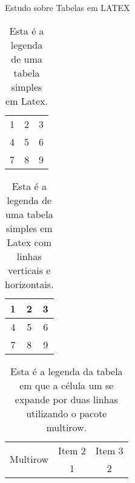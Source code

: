 \documentclass[a4paper, 12pt]{article}
\begin{document}
Estudo sobre Tabelas em LATEX

%   

  \begin{table}[H]
      \caption{Esta é a legenda de uma tabela simples em Latex.}
      \centering %
      
      \begin{tabular}{ccc} %

      1 & 2 & 3 \\  								
      4 & 5 & 6 \\
      7 & 8 & 9  
      
      \end{tabular}
  \end{table}
  
  
    \begin{table}[H]
      \caption{Esta é a legenda de uma tabela simples em Latex com linhas verticais e horizontais.}
      \centering %
      
      \begin{tabular}{|c|c|c|} %

      \hline
      1 & 2 & 3 \\ \hline  								
      4 & 5 & 6 \\ \hline
      7 & 8 & 9  \\ 
      \hline
      
      \end{tabular}
  \end{table}


  \begin{table}[H]
      \caption{Esta é a legenda da tabela em que a célula um se expande por duas linhas 
      utilizando o pacote multirow.}
      \centering %
      
      \begin{tabular}{|c|c|c|} %

      \hline %
      
      \multirow{2}{*}{Multirow} & Item 2 & Item 3 \\ \cline{2-3} 								
      & 1 & 2\\ \hline
      
      \end{tabular}
  \end{table}
  
\end{document}
